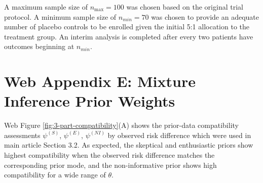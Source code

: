 \documentclass[AMA,STIX1COL,doublespace]{WileyNJD-v2}
\begin{document}

A maximum sample size of $n_{\text{max}}=100$ was chosen based on the original trial protocol.
%
A minimum sample size of $n_{min}=70$ was chosen to provide an adequate number of placebo controls to be enrolled given the initial 5:1 allocation to the treatment group.
%
An interim analysis is completed after every two patients have outcomes beginning at $n_{min}$.

\section*{Web Appendix E: Mixture Inference Prior Weights}\label{sec:priorRobustness}
Web Figure \ref{fig:3-part-compatibility}(A) shows the prior-data compatibility assessments $\psi^{(S)}$, $\psi^{(E)}$, $\psi^{(NI)}$ by observed risk difference which were used in main article Section 3.2.
%
As expected, the skeptical and enthusiastic priors show highest compatibility when the observed risk difference matches the corresponding prior mode, and the non-informative prior shows high compatibility for a wide range of $\theta$.
\end{document}

